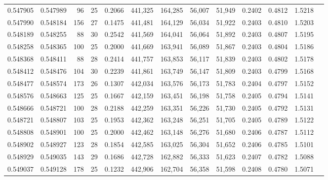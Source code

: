 \begin{tabular}{rrrrrrrrrrrrr}
0.547905 & 0.547989 &  96 &  25 &                                     0.2066 & 441,325 & 164,285 &  56,007 &  51,949 & 0.2402 & 0.4812 & 1.5218 \\
0.547990 & 0.548184 & 156 &  27 &                                     0.1475 & 441,481 & 164,129 &  56,034 &  51,922 & 0.2403 & 0.4810 & 1.5203 \\
0.548189 & 0.548255 &  88 &  30 &                                     0.2542 & 441,569 & 164,041 &  56,064 &  51,892 & 0.2403 & 0.4807 & 1.5195 \\
0.548258 & 0.548365 & 100 &  25 &                                     0.2000 & 441,669 & 163,941 &  56,089 &  51,867 & 0.2403 & 0.4804 & 1.5186 \\
0.548368 & 0.548411 &  88 &  28 &                                     0.2414 & 441,757 & 163,853 &  56,117 &  51,839 & 0.2403 & 0.4802 & 1.5178 \\
0.548412 & 0.548476 & 104 &  30 &                                     0.2239 & 441,861 & 163,749 &  56,147 &  51,809 & 0.2403 & 0.4799 & 1.5168 \\
0.548477 & 0.548574 & 173 &  26 &                                     0.1307 & 442,034 & 163,576 &  56,173 &  51,783 & 0.2404 & 0.4797 & 1.5152 \\
0.548576 & 0.548663 & 125 &  25 &                                     0.1667 & 442,159 & 163,451 &  56,198 &  51,758 & 0.2405 & 0.4794 & 1.5141 \\
0.548666 & 0.548721 & 100 &  28 &                                     0.2188 & 442,259 & 163,351 &  56,226 &  51,730 & 0.2405 & 0.4792 & 1.5131 \\
0.548721 & 0.548807 & 103 &  25 &                                     0.1953 & 442,362 & 163,248 &  56,251 &  51,705 & 0.2405 & 0.4789 & 1.5122 \\
0.548808 & 0.548901 & 100 &  25 &                                     0.2000 & 442,462 & 163,148 &  56,276 &  51,680 & 0.2406 & 0.4787 & 1.5112 \\
0.548902 & 0.548927 & 123 &  28 &                                     0.1854 & 442,585 & 163,025 &  56,304 &  51,652 & 0.2406 & 0.4785 & 1.5101 \\
0.548929 & 0.549035 & 143 &  29 &                                     0.1686 & 442,728 & 162,882 &  56,333 &  51,623 & 0.2407 & 0.4782 & 1.5088 \\
0.549037 & 0.549128 & 178 &  25 &                                     0.1232 & 442,906 & 162,704 &  56,358 &  51,598 & 0.2408 & 0.4780 & 1.5071 \\

\end{tabular}
